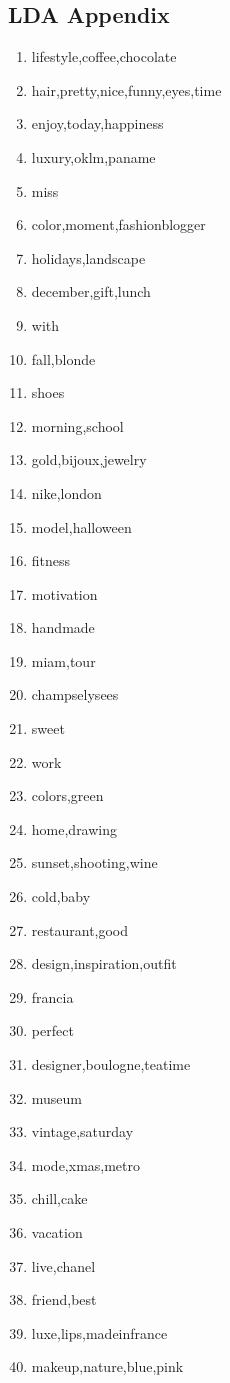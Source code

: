 
\clearpage
\begin{appendix}
\chapter{LDA Appendix}

\begin{enumerate}
  \item lifestyle,coffee,chocolate
  \item hair,pretty,nice,funny,eyes,time
  \item enjoy,today,happiness
  \item luxury,oklm,paname
  \item miss
  \item color,moment,fashionblogger
  \item holidays,landscape
  \item december,gift,lunch
  \item with
  \item fall,blonde
  \item shoes
  \item morning,school
  \item gold,bijoux,jewelry
  \item nike,london
  \item model,halloween
  \item fitness
  \item motivation
  \item handmade
  \item miam,tour
  \item champselysees
  \item sweet
  \item work
  \item colors,green
  \item home,drawing
  \item sunset,shooting,wine
  \item cold,baby
  \item restaurant,good
  \item design,inspiration,outfit
  \item francia
  \item perfect
  \item designer,boulogne,teatime
  \item museum
  \item vintage,saturday
  \item mode,xmas,metro
  \item chill,cake
  \item vacation
  \item live,chanel
  \item friend,best
  \item luxe,lips,madeinfrance
  \item makeup,nature,blue,pink
\end{enumerate}
\end{appendix}

